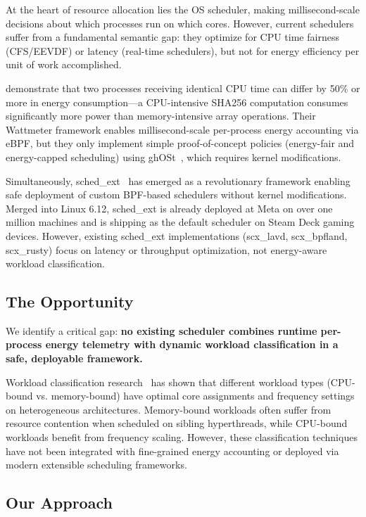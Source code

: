 \documentclass{article}
\begin{document}
At the heart of resource allocation lies the OS scheduler, making millisecond-scale decisions about which processes run on which cores. However, current schedulers suffer from a fundamental semantic gap: they optimize for CPU time fairness (CFS/EEVDF) or latency (real-time schedulers), but not for energy efficiency per unit of work accomplished.

\citet{qiao2024energy} demonstrate that two processes receiving identical CPU time can differ by 50\% or more in energy consumption---a CPU-intensive SHA256 computation consumes significantly more power than memory-intensive array operations. Their Wattmeter framework enables millisecond-scale per-process energy accounting via eBPF, but they only implement simple proof-of-concept policies (energy-fair and energy-capped scheduling) using ghOSt~\citep{humphries2021ghost}, which requires kernel modifications.

Simultaneously, sched\_ext~\citep{heo2024schedext} has emerged as a revolutionary framework enabling safe deployment of custom BPF-based schedulers without kernel modifications. Merged into Linux 6.12, sched\_ext is already deployed at Meta on over one million machines and is shipping as the default scheduler on Steam Deck gaming devices. However, existing sched\_ext implementations (scx\_lavd, scx\_bpfland, scx\_rusty) focus on latency or throughput optimization, not energy-aware workload classification.

\subsection{The Opportunity}

We identify a critical gap: \textbf{no existing scheduler combines runtime per-process energy telemetry with dynamic workload classification in a safe, deployable framework.}

Workload classification research~\citep{shafik2020low, gupta2016workload} has shown that different workload types (CPU-bound vs. memory-bound) have optimal core assignments and frequency settings on heterogeneous architectures. Memory-bound workloads often suffer from resource contention when scheduled on sibling hyperthreads, while CPU-bound workloads benefit from frequency scaling. However, these classification techniques have not been integrated with fine-grained energy accounting or deployed via modern extensible scheduling frameworks.

\subsection{Our Approach}
\end{document}
